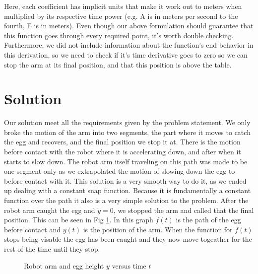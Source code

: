 \documentclass[nofoot,pdf-a,balance,colorlinks,upint,subscriptcorrection,varvw,mathalfa=cal=boondoxo]{asmeconf}
\begin{document}
    Here, each coefficient has implicit units that make it work out to meters when multiplied by its respective time power (e.g. A is in meters per second to the fourth, E is in meters). Even though our above formulation should guarantee that this function goes through every required point, it's worth double checking. Furthermore, we did not include information about the function's end behavior in this derivation, so we need to check if it's time derivative goes to zero so we can stop the arm at its final position, and that this position is above the table.



	 
	\section*{Solution}
	
    Our solution meet all the requirements given by the problem statement. We only broke the motion of the arm into two segments, the part where it moves to catch the egg and recovers, and the final position we stop it at. There is the motion before contact with the robot where it is accelerating down, and after when it starts to slow down. The robot arm itself traveling on this path was made to be one segment only as we extrapolated the motion of slowing down the egg to before contact with it. This solution is a very smooth way to do it, as we ended up dealing with a constant snap function. Because it is fundamentally a constant function over the path it also is a very simple solution to the problem. After the robot arm caught the egg and $\dot{y} = 0$, we stopped the arm and called that the final position. This can be seen in Fig \ref{fig1}. In this graph $f\left(t\right)$ is the path of the egg before contact and $y\left(t\right)$ is the position of the arm. When the function for $f\left(t\right)$ stops being visable the egg has been caught and they now move togeather for the rest of the time until they stop. \newline

    \begin{figure}[H]
        \caption{Robot arm and egg height $y$ versus time $t$}\label{fig1}
    \end{figure}
\end{document}
